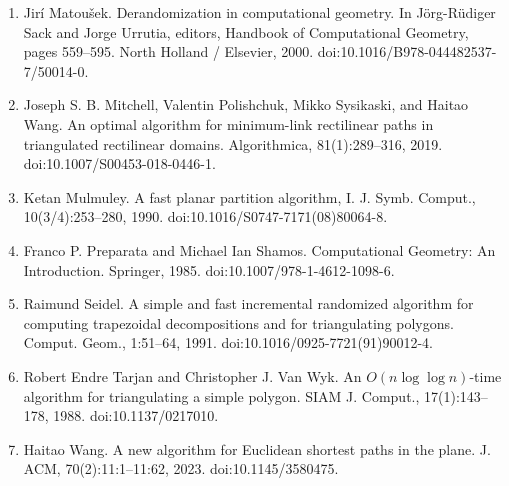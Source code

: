 \documentclass[10pt,a4paper]{article}
\begin{document}
\begin{enumerate}
\item[]  [23]  Jirí Matoušek.  Derandomization in computational geometry.  In Jörg-Rüdiger Sack and Jorge Urrutia, editors, Handbook of Computational Geometry, pages 559–595. North Holland / Elsevier, 2000.  doi:10.1016/B978-044482537-7/50014-0.  
\item[]  [24]  Joseph S. B. Mitchell, Valentin Polishchuk, Mikko Sysikaski, and Haitao Wang.  An optimal algorithm for minimum-link rectilinear paths in triangulated rectilinear domains.  Algorithmica, 81(1):289–316, 2019.  doi:10.1007/S00453-018-0446-1.  
\item[]  [25]  Ketan Mulmuley.  A fast planar partition algorithm, I.  J. Symb. Comput., 10(3/4):253–280, 1990.  doi:10.1016/S0747-7171(08)80064-8.  
\item[]  [26]  Franco P. Preparata and Michael Ian Shamos.  Computational Geometry: An Introduction.  Springer, 1985.  doi:10.1007/978-1-4612-1098-6.  
\item[]  [27]  Raimund Seidel.  A simple and fast incremental randomized algorithm for computing trapezoidal decompositions and for triangulating polygons.  Comput. Geom., 1:51–64, 1991.  doi:10.1016/0925-7721(91)90012-4.  
\item[]  [28]  Robert Endre Tarjan and Christopher J. Van Wyk.  An $O(n\log\log n)$-time algorithm for triangulating a simple polygon.  SIAM J. Comput., 17(1):143–178, 1988.  doi:10.1137/0217010.  
\item[]  [29]  Haitao Wang.  A new algorithm for Euclidean shortest paths in the plane.  J. ACM, 70(2):11:1–11:62, 2023.  doi:10.1145/3580475.  
\end{enumerate}
\end{document}
